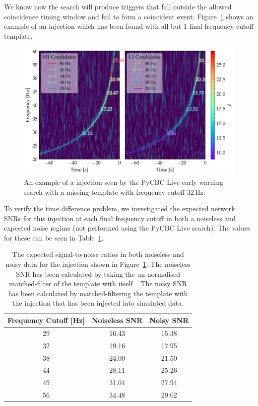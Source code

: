 We know now the search will produce triggers that fall outside the allowed coincidence timing window and fail to form a coincident event. Figure~\ref{6:fig:missing-freq-eg} shows an example of an injection which has been found with all but $1$ final frequency cutoff template. 
%
\begin{figure}
    \centering
    \includegraphics[width=1.0\linewidth]{images/6_earlywarning/stories/missing_freqs_example.pdf}
    \caption{An example of a \gwadj injection seen by the PyCBC Live early warning search with a missing template with frequency cutoff $32 \, \text{Hz}$.}
    \label{6:fig:missing-freq-eg}
\end{figure}
%
To verify the time difference problem, we investigated the expected network SNRs for this injection at each final frequency cutoff in both a noiseless and expected noise regime (not performed using the PyCBC Live search). The values for these can be seen in Table~\ref{6:tab:noise_snrs}.
%
\begin{table}[ht]
    \centering
    \setlength{\tabcolsep}{4pt}
    \begin{tabular}{ccc}
        \toprule
        \textbf{Frequency Cutoff [Hz]} & \textbf{Noiseless SNR} & \textbf{Noisy SNR} \\
        \midrule
        29 & 16.43 & 15.38 \\
        32 & 19.16 & 17.95 \\
        38 & 24.00 & 21.50 \\
        44 & 28.11 & 25.26 \\
        49 & 31.04 & 27.94 \\
        56 & 34.48 & 29.02 \\
        \bottomrule
    \end{tabular}
    \caption{The expected signal-to-noise ratios in both noiseless and noisy data for the \gwadj injection shown in Figure~\ref{6:fig:missing-freq-eg}. The noiseless SNR has been calculated by taking the un-normalised matched-filter of the template with itself~\cite{Brown_Thesis:2004}. The noisy SNR has been calculated by matched-filtering the template with the injection that has been injected into simulated \gwadj data.}
    \label{6:tab:noise_snrs}
\end{table}
